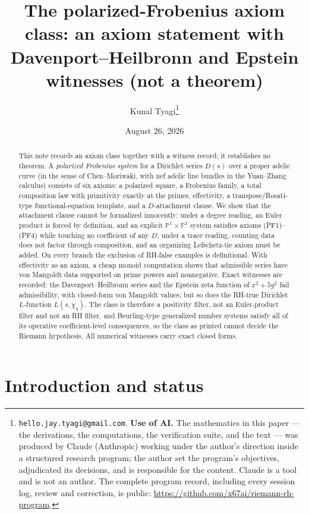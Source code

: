 \documentclass[11pt]{article}
\title{The polarized-Frobenius axiom class: an axiom statement with
Davenport--Heilbronn and Epstein witnesses (not a theorem)}
\author{Kunal Tyagi\thanks{%
\texttt{hello.jay.tyagi@gmail.com}. \textbf{Use of AI.} The mathematics in this
paper --- the derivations, the computations, the verification suite, and the
text --- was produced by Claude (Anthropic) working under the author's direction
inside a structured research program; the author set the program's objectives,
adjudicated its decisions, and is responsible for the content. Claude is a tool and
is not an author. The complete program record, including every session log, review
and correction, is public: \url{https://github.com/x67ai/riemann-rh-program}.}}
\date{August 26, 2026}
\theoremstyle{plain}
\theoremstyle{definition}
\theoremstyle{remark}
\begin{document}
\maketitle

\begin{abstract}
This note records an axiom class together with a witness record; it establishes no
theorem. A \emph{polarized Frobenius system} for a Dirichlet series $D(s)$ over a
proper adelic curve (in the sense of Chen--Moriwaki, with nef adelic line bundles in
the Yuan--Zhang calculus) consists of six axioms: a polarized square, a Frobenius
family, a total composition law with primitivity exactly at the primes, effectivity,
a transpose/Rosati-type functional-equation template, and a $D$-attachment clause.
We show that the attachment clause cannot be formalized innocently: under a degree
reading, an Euler product is forced by definition, and an explicit
$\mathbb{P}^1 \times \mathbb{P}^1$ system satisfies axioms (PF1)--(PF4) while
touching no coefficient of any $D$; under a trace reading, counting data does not
factor through composition, and an organizing Lefschetz-tie axiom must be added. On
every branch the exclusion of RH-false examples is definitional. With effectivity as
an axiom, a cheap monoid computation shows that admissible series have von Mangoldt
data supported on prime powers and nonnegative. Exact witnesses are recorded: the
Davenport--Heilbronn series and the Epstein zeta function of $x^2 + 5y^2$ fail
admissibility, with closed-form von Mangoldt values; but so does the RH-true
Dirichlet $L$-function $L(s, \chi_4)$. The class is therefore a positivity filter,
not an Euler-product filter and not an RH filter, and Beurling-type generalized
number systems satisfy all of its operative coefficient-level consequences, so the
class as printed cannot decide the Riemann hypothesis. All numerical witnesses carry
exact closed forms.
\end{abstract}

\section{Introduction and status}\label{sec:intro}
\end{document}
